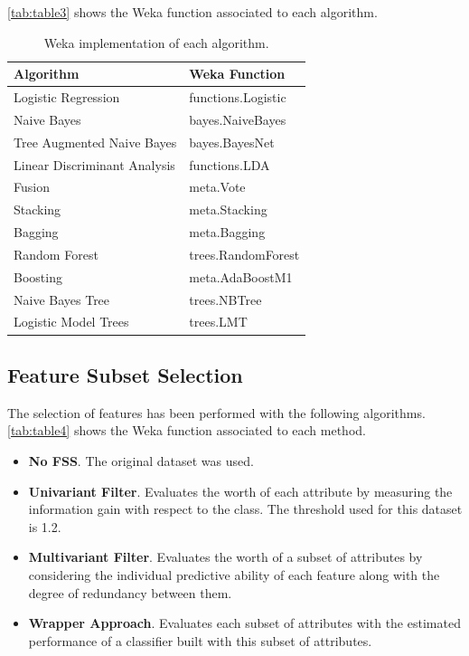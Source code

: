 \documentclass[a4paper,11pt]{article}
\begin{document}
\autoref{tab:table3} shows the Weka function associated to each algorithm.

\begin{table}[h]
\centering
\begin{tabular}{||l|l||}
	\hline
	Algorithm & Weka Function\\
	\hline
	Logistic Regression & functions.Logistic\\
	Naive Bayes & bayes.NaiveBayes\\
	Tree Augmented Naive Bayes & bayes.BayesNet\\
	Linear Discriminant Analysis & functions.LDA\\
	Fusion & meta.Vote \\
	Stacking & meta.Stacking\\
	Bagging & meta.Bagging\\
	Random Forest & trees.RandomForest\\
	Boosting & meta.AdaBoostM1\\
	Naive Bayes Tree & trees.NBTree\\
	Logistic Model Trees & trees.LMT\\
	\hline
\end{tabular}
\caption{Weka implementation of each algorithm.}
\label{tab:table3}
\end{table}

\subsection{Feature Subset Selection}
\label{subsec:fss}

The selection of features has been performed with the following algorithms. \autoref{tab:table4} shows the Weka function associated to each method.

\begin{itemize}
\setlength\itemsep{-1ex}
\item \textbf{No FSS}. The original dataset was used.
\item \textbf{Univariant Filter}. Evaluates the worth of each attribute by measuring the information gain with respect to the class. The threshold used for this dataset is 1.2.
\item \textbf{Multivariant Filter}. Evaluates the worth of a subset of attributes by considering the individual predictive ability of each feature along with the degree of redundancy between them.
\item \textbf{Wrapper Approach}. Evaluates each subset of attributes with the estimated performance of a classifier built with this subset of attributes.
\end{itemize}
\end{document}
